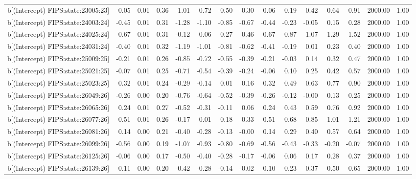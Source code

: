 \begin{table}[ht]
\begin{tabular}{rrrrrrrrrrrrrrr}
  b[(Intercept) FIPS:state:23005:23] & -0.05 & 0.01 & 0.36 & -1.01 & -0.72 & -0.50 & -0.30 & -0.06 & 0.19 & 0.42 & 0.64 & 0.91 & 2000.00 & 1.00 \\ 
  b[(Intercept) FIPS:state:24003:24] & -0.45 & 0.01 & 0.31 & -1.28 & -1.10 & -0.85 & -0.67 & -0.44 & -0.23 & -0.05 & 0.15 & 0.28 & 2000.00 & 1.00 \\ 
  b[(Intercept) FIPS:state:24025:24] & 0.67 & 0.01 & 0.31 & -0.12 & 0.06 & 0.27 & 0.46 & 0.67 & 0.87 & 1.07 & 1.29 & 1.52 & 2000.00 & 1.00 \\ 
  b[(Intercept) FIPS:state:24031:24] & -0.40 & 0.01 & 0.32 & -1.19 & -1.01 & -0.81 & -0.62 & -0.41 & -0.19 & 0.01 & 0.23 & 0.40 & 2000.00 & 1.00 \\ 
  b[(Intercept) FIPS:state:25009:25] & -0.21 & 0.01 & 0.26 & -0.85 & -0.72 & -0.55 & -0.39 & -0.21 & -0.03 & 0.14 & 0.32 & 0.47 & 2000.00 & 1.00 \\ 
  b[(Intercept) FIPS:state:25021:25] & -0.07 & 0.01 & 0.25 & -0.71 & -0.54 & -0.39 & -0.24 & -0.06 & 0.10 & 0.25 & 0.42 & 0.57 & 2000.00 & 1.00 \\ 
  b[(Intercept) FIPS:state:25023:25] & 0.32 & 0.01 & 0.24 & -0.29 & -0.14 & 0.01 & 0.16 & 0.32 & 0.49 & 0.63 & 0.77 & 0.90 & 2000.00 & 1.00 \\ 
  b[(Intercept) FIPS:state:26049:26] & -0.26 & 0.00 & 0.20 & -0.76 & -0.64 & -0.52 & -0.39 & -0.26 & -0.12 & -0.00 & 0.13 & 0.25 & 2000.00 & 1.00 \\ 
  b[(Intercept) FIPS:state:26065:26] & 0.24 & 0.01 & 0.27 & -0.52 & -0.31 & -0.11 & 0.06 & 0.24 & 0.43 & 0.59 & 0.76 & 0.92 & 2000.00 & 1.00 \\ 
  b[(Intercept) FIPS:state:26077:26] & 0.51 & 0.01 & 0.26 & -0.17 & 0.01 & 0.18 & 0.33 & 0.51 & 0.68 & 0.85 & 1.01 & 1.21 & 2000.00 & 1.00 \\ 
  b[(Intercept) FIPS:state:26081:26] & 0.14 & 0.00 & 0.21 & -0.40 & -0.28 & -0.13 & -0.00 & 0.14 & 0.29 & 0.40 & 0.57 & 0.64 & 2000.00 & 1.00 \\ 
  b[(Intercept) FIPS:state:26099:26] & -0.56 & 0.00 & 0.19 & -1.07 & -0.93 & -0.80 & -0.69 & -0.56 & -0.43 & -0.33 & -0.20 & -0.07 & 2000.00 & 1.00 \\ 
  b[(Intercept) FIPS:state:26125:26] & -0.06 & 0.00 & 0.17 & -0.50 & -0.40 & -0.28 & -0.17 & -0.06 & 0.06 & 0.17 & 0.28 & 0.37 & 2000.00 & 1.00 \\ 
  b[(Intercept) FIPS:state:26139:26] & 0.11 & 0.00 & 0.20 & -0.42 & -0.28 & -0.14 & -0.02 & 0.10 & 0.23 & 0.37 & 0.50 & 0.65 & 2000.00 & 1.00 \\ 

\end{tabular}
\end{table}
